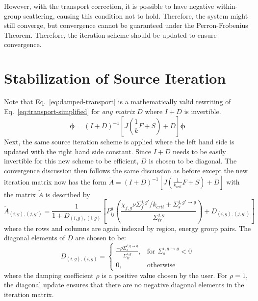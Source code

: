 However, with the transport correction, it is possible to have negative within-group scattering, causing this condition not to hold. Therefore, the system might still converge, but convergence cannot be guaranteed under the Perron-Frobenius Theorem. Therefore, the iteration scheme should be updated to ensure convergence. 

\section{Stabilization of Source Iteration}
\label{sec:diagonal-stabilization}

Note that Eq.~\ref{eq:damped-transport} is a mathematically valid rewriting of Eq.~\ref{eq:transport-simplified} for \textit{any matrix} $D$ where $I+D$ is invertible. 
\begin{equation}
	\boldsymbol{\phi} = (I+D)^{-1} \left[J \left(\frac{1}{k} F + S \right) + D \right]\boldsymbol{\phi}
	\label{eq:damped-transport}
\end{equation}
Next, the same source iteration scheme is applied where the left hand side is updated with the right hand side constant. Since $I+D$ needs to be easily invertible for this new scheme to be efficient, $D$ is chosen to be diagonal. The convergence discussion then follows the same discussion as before except the new iteration matrix  now has the form $\tilde{A} = (I+D)^{-1} \left[ J \left(\frac{1}{k_{\textit{crit}}} F + S \right) + D \right]$  with the matrix $\tilde{A}$ is described by
\begin{equation}
	\tilde{A}_{(i,g), (j, g')} = \frac{1}{1 + D_{(i,g), (i,g)}}\left[P_{ij}^g \left(\frac{\chi_{j,g} \nu\Sigma_{f}^{j,g'} / k_{\textit{crit}} + \Sigma_{s}^{j,g' \rightarrow g}}{\Sigma_{\textit{tr}}^{j, g}}\right) + D_{(i,g), (j, g')}\right]
	\label{eq:a-tilde}
\end{equation}
where the rows and columns are again indexed by region, energy group pairs. The diagonal elements of $D$ are chosen to be:
\begin{equation}
	D_{(i,g), (i,g)} = \left\{\begin{array}{lr}
		\frac{-\rho \Sigma_{s}^{i,g \rightarrow g}}{\Sigma_{\textit{tr}}^{i, g}} , & \text{for } \Sigma_{s}^{i, g \rightarrow g} < 0\\
		0, & \text{otherwise}
	\end{array}\right.
	\label{eq:d-matrix}
\end{equation}
where the damping coefficient $\rho$ is a positive value chosen by the user. For $\rho = 1$, the diagonal update ensures that there are no negative diagonal elements in the iteration matrix. 

